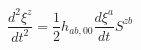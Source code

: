 \begin{equation}
\frac{d^{2}\xi ^{z}}{dt^{2}}=\frac{1}{2}h_{ab,00}\frac{d\xi ^{a}}{dt}S^{zb}
\label{50}
\end{equation}

